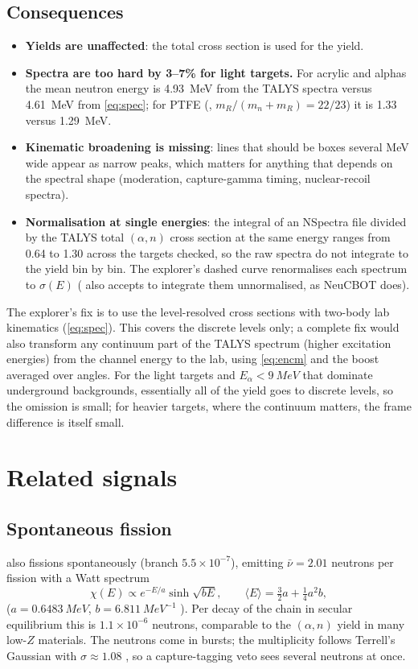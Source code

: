 \subsection{Consequences}
\begin{itemize}
\item \textbf{Yields are unaffected}: the total cross section is used for the yield.
\item \textbf{Spectra are too hard by 3--7\% for light targets.} For acrylic and  alphas the mean neutron energy is \SI{4.93}{MeV} from the TALYS spectra versus \SI{4.61}{MeV} from \cref{eq:spec}; for PTFE (, $m_R/(m_n+m_R) = 22/23$) it is 1.33 versus \SI{1.29}{MeV}.
\item \textbf{Kinematic broadening is missing}: lines that should be boxes several MeV wide appear as narrow peaks, which matters for anything that depends on the spectral shape (moderation, capture-gamma timing, nuclear-recoil spectra).
\item \textbf{Normalisation at single energies}: the integral of an NSpectra file divided by the TALYS total $(\alpha,n)$ cross section at the same energy ranges from 0.64 to 1.30 across the targets checked, so the raw spectra do not integrate to the yield bin by bin. The explorer's dashed curve renormalises each spectrum to $\sigma(E)$ ( also accepts  to integrate them unnormalised, as NeuCBOT does).
\end{itemize}
The explorer's fix is to use the level-resolved cross sections with two-body lab kinematics (\cref{eq:spec}). This covers the discrete levels only; a complete fix would also transform any continuum part of the TALYS spectrum (higher excitation energies) from the channel energy to the lab, using \cref{eq:encm} and the boost averaged over angles. For the light targets and $E_\alpha < \SI{9}{MeV}$ that dominate underground backgrounds, essentially all of the yield goes to discrete levels, so the omission is small; for heavier targets, where the continuum matters, the frame difference is itself small.


\section{Related signals}
\subsection{Spontaneous fission}
 also fissions spontaneously (branch $5.5\times10^{-7}$), emitting $\bar\nu = 2.01$ neutrons per fission with a Watt spectrum
\begin{equation}
\chi(E) \propto e^{-E/a}\sinh\sqrt{bE},\qquad \langle E\rangle = \tfrac32 a + \tfrac14 a^2 b,
\end{equation}
($a = \SI{0.6483}{MeV}$, $b = \SI{6.811}{MeV^{-1}}$ \cite{sources4}). Per decay of the  chain in secular equilibrium this is $1.1\times10^{-6}$ neutrons, comparable to the $(\alpha,n)$ yield in many low-$Z$ materials. The neutrons come in bursts; the multiplicity follows Terrell's Gaussian with $\sigma \approx 1.08$ \cite{terrell}, so a capture-tagging veto sees several neutrons at once.

